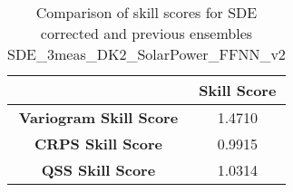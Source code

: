 
        \begin{table}[h!]
            \centering
            \begin{tabular}{|c|c|}
                \hline
                & \textbf{Skill Score}  \\
                \hline
                \textbf{Variogram Skill Score} & 1.4710  \\
                \hline
                \textbf{CRPS Skill Score} & 0.9915  \\
                \hline
                \textbf{QSS Skill Score} & 1.0314 \\
                \hline
            \end{tabular}
            \caption{Comparison of skill scores for SDE corrected and previous ensembles SDE_3meas_DK2_SolarPower_FFNN_v2}
            \label{table:skill_scores_comparison}
        \end{table}
        